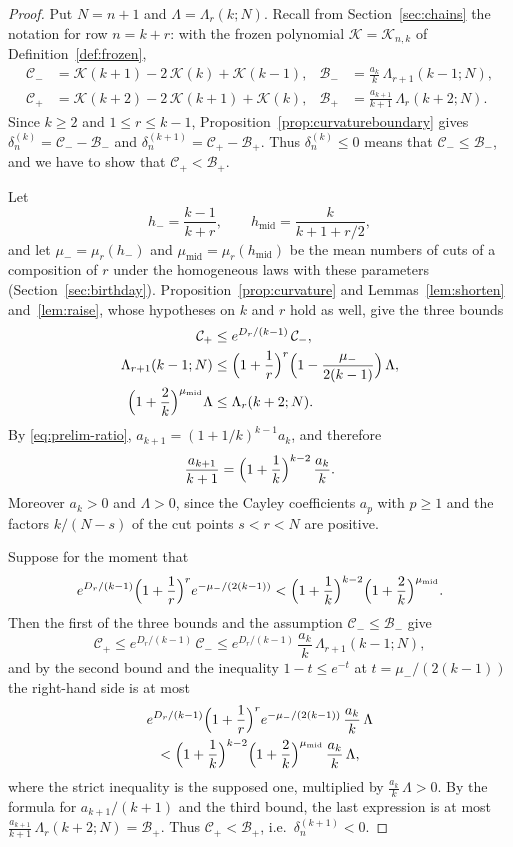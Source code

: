 \documentclass{amsart}
\theoremstyle{definition}
\theoremstyle{remark}
\numberwithin{equation}{section}
\begin{document}
\begin{proof}
Put $N=n+1$ and $\Lambda=\Lambda_r(k;N)$. Recall from Section~\ref{sec:chains} the notation for row $n=k+r$: with the frozen polynomial $\mathcal K=\mathcal K_{n,k}$ of Definition~\ref{def:frozen},
\begin{align*}
\mathcal C_-&=\mathcal K(k+1)-2\,\mathcal K(k)+\mathcal K(k-1), & \mathcal B_-&=\frac{a_k}{k}\,\Lambda_{r+1}(k-1;N),\\
\mathcal C_+&=\mathcal K(k+2)-2\,\mathcal K(k+1)+\mathcal K(k), & \mathcal B_+&=\frac{a_{k+1}}{k+1}\,\Lambda_r(k+2;N).
\end{align*}
Since $k\ge 2$ and $1\le r\le k-1$, Proposition~\ref{prop:curvatureboundary} gives $\delta^{(k)}_n=\mathcal C_--\mathcal B_-$ and $\delta^{(k+1)}_n=\mathcal C_+-\mathcal B_+$. Thus $\delta^{(k)}_n\le 0$ means that $\mathcal C_-\le\mathcal B_-$, and we have to show that $\mathcal C_+<\mathcal B_+$.

Let
\[
h_-=\frac{k-1}{k+r},\qquad h_{\mathrm{mid}}=\frac{k}{k+1+r/2},
\]
and let $\mu_-=\mu_r(h_-)$ and $\mu_{\mathrm{mid}}=\mu_r(h_{\mathrm{mid}})$ be the mean numbers of cuts of a composition of $r$ under the homogeneous laws with these parameters (Section~\ref{sec:birthday}). Proposition~\ref{prop:curvature} and Lemmas~\ref{lem:shorten} and~\ref{lem:raise}, whose hypotheses on $k$ and $r$ hold as well, give the three bounds
\begin{align*}
\mathcal C_+&\le e^{D_r/(k-1)}\,\mathcal C_-,\\
\Lambda_{r+1}(k-1;N)&\le\Bigl(1+\frac1r\Bigr)^{r}\Bigl(1-\frac{\mu_-}{2(k-1)}\Bigr)\,\Lambda,\\
\Bigl(1+\frac2k\Bigr)^{\mu_{\mathrm{mid}}}\Lambda&\le\Lambda_r(k+2;N).
\end{align*}
By \eqref{eq:prelim-ratio}, $a_{k+1}=(1+1/k)^{k-1}a_k$, and therefore
\[
\frac{a_{k+1}}{k+1}=\Bigl(1+\frac1k\Bigr)^{k-2}\,\frac{a_k}{k}.
\]
Moreover $a_k>0$ and $\Lambda>0$, since the Cayley coefficients $a_p$ with $p\ge 1$ and the factors $k/(N-s)$ of the cut points $s<r<N$ are positive.

Suppose for the moment that
\[
e^{D_r/(k-1)}\Bigl(1+\frac1r\Bigr)^{r}e^{-\mu_-/(2(k-1))}<\Bigl(1+\frac1k\Bigr)^{k-2}\Bigl(1+\frac2k\Bigr)^{\mu_{\mathrm{mid}}}.
\]
Then the first of the three bounds and the assumption $\mathcal C_-\le\mathcal B_-$ give
\[
\mathcal C_+\le e^{D_r/(k-1)}\,\mathcal C_-\le e^{D_r/(k-1)}\,\frac{a_k}{k}\,\Lambda_{r+1}(k-1;N),
\]
and by the second bound and the inequality $1-t\le e^{-t}$ at $t=\mu_-/(2(k-1))$ the right-hand side is at most
\begin{multline*}
e^{D_r/(k-1)}\Bigl(1+\frac1r\Bigr)^{r}e^{-\mu_-/(2(k-1))}\,\frac{a_k}{k}\,\Lambda\\
<\Bigl(1+\frac1k\Bigr)^{k-2}\Bigl(1+\frac2k\Bigr)^{\mu_{\mathrm{mid}}}\,\frac{a_k}{k}\,\Lambda ,
\end{multline*}
where the strict inequality is the supposed one, multiplied by $\frac{a_k}{k}\,\Lambda>0$. By the formula for $a_{k+1}/(k+1)$ and the third bound, the last expression is at most $\frac{a_{k+1}}{k+1}\,\Lambda_r(k+2;N)=\mathcal B_+$. Thus $\mathcal C_+<\mathcal B_+$, i.e.\ $\delta^{(k+1)}_n<0$.


\end{proof}
\end{document}

